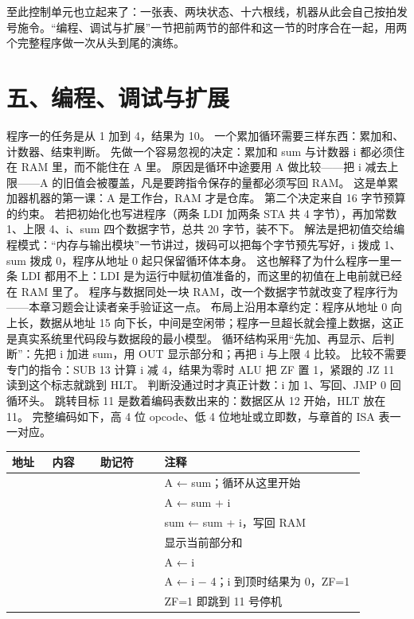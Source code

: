 至此控制单元也立起来了：一张表、两块状态、十六根线，机器从此会自己按拍发号施令。“编程、调试与扩展”一节把前两节的部件和这一节的时序合在一起，用两个完整程序做一次从头到尾的演练。

\section{五、编程、调试与扩展}

程序一的任务是从 1 加到 4，结果为 10。
一个累加循环需要三样东西：累加和、计数器、结束判断。
先做一个容易忽视的决定：累加和 sum 与计数器 i 都必须住在 RAM 里，而不能住在 A 里。
原因是循环中途要用 A 做比较——把 i 减去上限——A 的旧值会被覆盖，凡是要跨指令保存的量都必须写回 RAM。
这是单累加器机器的第一课：A 是工作台，RAM 才是仓库。
第二个决定来自 16 字节预算的约束。
若把初始化也写进程序（两条 LDI 加两条 STA 共 4 字节），再加常数 1、上限 4、i、sum 四个数据字节，总共 20 字节，装不下。
解法是把初值交给编程模式：“内存与输出模块”一节讲过，拨码可以把每个字节预先写好，i 拨成 1、sum 拨成 0，程序从地址 0 起只保留循环体本身。
这也解释了为什么程序一里一条 LDI 都用不上：LDI 是为运行中赋初值准备的，而这里的初值在上电前就已经在 RAM 里了。
程序与数据同处一块 RAM，改一个数据字节就改变了程序行为——本章习题会让读者亲手验证这一点。
布局上沿用本章约定：程序从地址 0 向上长，数据从地址 15 向下长，中间是空闲带；程序一旦超长就会撞上数据，这正是真实系统里代码段与数据段的最小模型。
循环结构采用“先加、再显示、后判断”：先把 i 加进 sum，用 OUT 显示部分和；再把 i 与上限 4 比较。
比较不需要专门的指令：SUB 13 计算 i 减 4，结果为零时 ALU 把 ZF 置 1，紧跟的 JZ 11 读到这个标志就跳到 HLT。
判断没通过时才真正计数：i 加 1、写回、JMP 0 回循环头。
跳转目标 11 是数着编码表数出来的：数据区从 12 开始，HLT 放在 11。
完整编码如下，高 4 位 opcode、低 4 位地址或立即数，与章首的 ISA 表一一对应。

\begin{longtable}{L{0.10\linewidth}L{0.12\linewidth}L{0.16\linewidth}L{0.50\linewidth}}
\toprule
地址 & 内容 & 助记符 & 注释 \\
\midrule
{} &  &  & A ← sum；循环从这里开始 \\\tablerowrule
{} &  &  & A ← sum + i \\\tablerowrule
{} &  &  & sum ← sum + i，写回 RAM \\\tablerowrule
{} &  &  & 显示当前部分和 \\\tablerowrule
{} &  &  & A ← i \\\tablerowrule
{} &  &  & A ← i − 4；i 到顶时结果为 0，ZF=1 \\\tablerowrule
{} &  &  & ZF=1 即跳到 11 号停机 \\
\bottomrule
\end{longtable}

